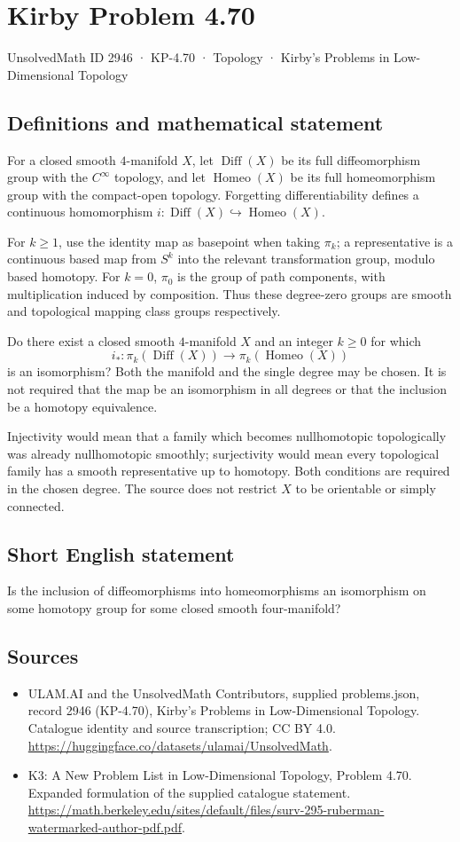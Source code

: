 \documentclass[11pt,a4paper]{article}
\begin{document}
\section*{Kirby Problem 4.70}\label{2946}
{\small UnsolvedMath ID 2946 · KP-4.70 · Topology · Kirby's Problems in Low-Dimensional Topology}
\subsection{Definitions and mathematical statement}
For a closed smooth $4$-manifold $X$, let $\operatorname{Diff}(X)$
be its full diffeomorphism group with the $C^\infty$ topology, and
let $\operatorname{Homeo}(X)$ be its full homeomorphism group with
the compact-open topology. Forgetting differentiability defines a
continuous homomorphism $i:\operatorname{Diff}(X)\hookrightarrow
\operatorname{Homeo}(X)$.

For $k\ge1$, use the identity map as basepoint when taking
$\pi_k$; a representative is a continuous based map from $S^k$
into the relevant transformation group, modulo based homotopy.
For $k=0$, $\pi_0$ is the group of path components, with
multiplication induced by composition. Thus these degree-zero groups
are smooth and topological mapping class groups respectively.

Do there exist a closed smooth $4$-manifold $X$ and an integer
$k\ge0$ for which
\[
 i_*:\pi_k(\operatorname{Diff}(X))
      \longrightarrow\pi_k(\operatorname{Homeo}(X))
\]
is an isomorphism?
Both the manifold and the single degree may be chosen. It is not
required that the map be an isomorphism in all degrees or that the
inclusion be a homotopy equivalence.

Injectivity would mean that a family which becomes nullhomotopic
topologically was already nullhomotopic smoothly; surjectivity would
mean every topological family has a smooth representative up to
homotopy. Both conditions are required in the chosen degree. The
source does not restrict $X$ to be orientable or simply connected.
\subsection{Short English statement}
Is the inclusion of diffeomorphisms into homeomorphisms an isomorphism on some homotopy group for some closed smooth four-manifold?
\subsection{Sources}
\begin{itemize}
\item[S1] ULAM.AI and the UnsolvedMath Contributors, supplied problems.json, record 2946 (KP-4.70), Kirby's Problems in Low-Dimensional Topology. Catalogue identity and source transcription; CC BY 4.0.
\url{https://huggingface.co/datasets/ulamai/UnsolvedMath}.
\item[S2] K3: A New Problem List in Low-Dimensional Topology, Problem 4.70. Expanded formulation of the supplied catalogue statement.
\url{https://math.berkeley.edu/sites/default/files/surv-295-ruberman-watermarked-author-pdf.pdf}.
\end{itemize}
\end{document}
